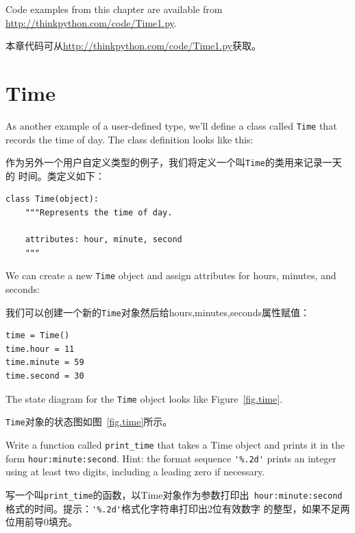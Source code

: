 \documentclass[10pt]{book}
\begin{document}
\begin{CJK}{UTF8}{gbsn}
Code examples from this chapter are available from
\url{http://thinkpython.com/code/Time1.py}.

本章代码可从\url{http://thinkpython.com/code/Time1.py}获取。

\section{Time}
\label{time.object}

As another example of a user-defined type, we'll define a class called
{\tt Time} that records the time of day.  The class definition looks
like this:

作为另外一个用户自定义类型的例子，我们将定义一个叫{\tt Time}的类用来记录一天的
时间。类定义如下：

\begin{verbatim}
class Time(object):
    """Represents the time of day.
       
    attributes: hour, minute, second
    """
\end{verbatim}
%
We can create a new {\tt Time} object and assign
attributes for hours, minutes, and seconds:

我们可以创建一个新的{\tt Time}对象然后给hours,minutes,seconds属性赋值：

\begin{verbatim}
time = Time()
time.hour = 11
time.minute = 59
time.second = 30
\end{verbatim}
%
The state diagram for the {\tt Time} object looks like Figure~\ref{fig.time}.

{\tt Time}对象的状态图如图~\ref{fig.time}所示。

\begin{exercise}
\label{ex.printtime}

Write a function called \verb"print_time" that takes a 
Time object and prints it in the form {\tt hour:minute:second}.
Hint: the format sequence \verb"'%.2d'" prints an integer using
at least two digits, including a leading zero if necessary.

写一个叫\verb"print_time"的函数，以Time对象作为参数打印出{\tt
hour:minute:second}格式的时间。提示：\verb"'%.2d'"格式化字符串打印出2位有效数字
的整型，如果不足两位用前导0填充。

\end{exercise}

\begin{exercise}
\label{isafter}


\end{exercise}
\end{CJK}
\end{document}
